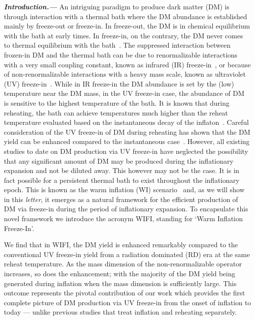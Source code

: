 \documentclass[notitlepage,nofootinbib,preprintnumbers,aps,superscriptaddress,twocolumn]{revtex4-1}
\begin{document}
\maketitle

\textbf{\textit{Introduction.---}} An intriguing paradigm to produce dark matter (DM) is through interaction with a thermal bath where the DM abundance is established mainly by freeze-out or freeze-in. In freeze-out, the DM is in chemical equilibrium with the bath at early times. In  freeze-in, on the contrary, the DM never comes to thermal equilibrium with the bath~\cite{Hall:2009bx}. The suppressed interaction between frozen-in DM and the thermal bath can be due to renormalizable interactions with a very small coupling constant, known as infrared (IR) freeze-in~\cite{Hall:2009bx}, or because of non-renormalizable interactions with a heavy mass scale, known as ultraviolet (UV) freeze-in~\cite{Elahi:2014fsa}. While in IR freeze-in the DM abundance is set by the (low) temperature near the DM mass, in the UV freeze-in case, the abundance of DM is sensitive to the highest temperature of the bath. It is known that during reheating, the bath can achieve temperatures much higher than the reheat temperature evaluated based on the instantaneous decay of the inflaton~\cite{Chung:1998rq,Giudice:2000ex,Kolb:2003ke}. Careful consideration of the UV freeze-in of DM during reheating has shown that the DM yield can be enhanced compared to the instantaneous case~\cite{Garcia:2017tuj,Chen:2017kvz,Bernal:2019mhf,Barman:2022tzk,Garcia:2018wtq,Chowdhury:2023jft}. However, all existing studies to date on DM production via UV freeze-in have neglected the possibility that any significant amount of DM may be produced during the inflationary expansion and not be diluted away.
This however may not be the case. It is in fact possible for a persistent thermal bath  to exist throughout the inflationary epoch. This is known as the warm inflation (WI) scenario~\cite{Berera:1995ie, Berera:1995wh, Berera:1998px} and, as we will show in this \textit{letter}, it emerges as a natural framework for the efficient production of DM via freeze-in during the period of inflationary expansion. To encapsulate this novel framework we introduce the acronym WIFI, standing for `Warm Inflation  Freeze-In'. 

We find that in WIFI, the DM yield is enhanced remarkably 
compared to the conventional UV freeze-in yield from
a radiation dominated (RD) era at the same reheat temperature. As the mass dimension of the non-renormalizable operator increases, so does the enhancement; with the majority of the DM yield being generated during inflation when the mass dimension is sufficiently large. This outcome represents the pivotal contribution of our work which  provides the first complete picture of DM production via UV
freeze-in from the onset of inflation to today — unlike previous studies that treat inflation and reheating separately.
\end{document}

